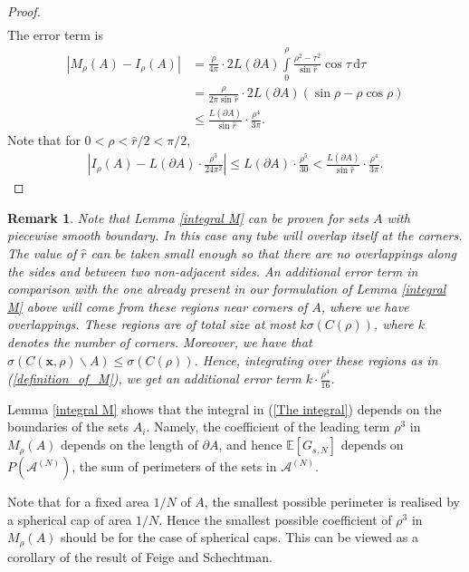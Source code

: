 \documentclass[a4paper,11pt]{amsart}
\newtheorem{remark}{Remark}
\begin{document}
\begin{proof}
\begin{align*}
\end{align*}
The error term is 
\begin{align*}
   \left|M_\rho(A)-I_\rho(A)\right|&=\frac{\rho}{4\pi}\cdot 2L(\partial A)\int\limits_{0}^\rho \frac{\rho^2-\tau^2}{\sin\hat r}\cos \tau\,\mathrm{d}\tau \\&
    =\frac{\rho}{2\pi\sin\hat r}\cdot 2L(\partial A)(\sin\rho -\rho \cos \rho)
    \\
    &\leq\frac{L(\partial A)}{\ \sin \hat r}\cdot \frac{\rho^4}{3\pi}.
\end{align*}
Note that for $0<\rho<\hat{r}/2<\pi/2$,
\begin{align*}
    \left| I_\rho(A)-L(\partial A)\cdot\frac{\rho^3}{24\pi^2} \right|\leq L(\partial A)\cdot \frac{\rho^5}{30} <\frac{L(\partial A)}{\ \sin \hat r}\cdot\frac{\rho^4}{3\pi}.
\end{align*}
\end{proof}

\begin{remark}\label{remark piecewise smooth}
    Note that Lemma \ref{integral M} can be proven for sets $A$ with piecewise smooth boundary. In this case any tube will overlap itself at the corners. The value of $\hat{r}$ can be taken small enough so that there are no overlappings along the sides and between two non-adjacent sides. An additional error term in comparison with the one already present in our formulation of Lemma \ref{integral M} above will come from these regions near corners of $A$, where we have overlappings. These regions are of total size at most $k\sigma\left(C(\rho)\right)$, where $k$ denotes the number of corners. Moreover, we have that $\sigma\left( C\left(\mathbf{x},\rho\right)\backslash A \right)\leq \sigma\left(C(\rho)\right)$. Hence, integrating over these regions as in (\ref{definition_of_M}), we get an additional error term $k\cdot\frac{\rho^4}{16}$.
\end{remark}
Lemma \ref{integral M} shows that the integral in (\ref{The integral}) depends on the boundaries of the sets $A_i$. Namely, the coefficient of the leading term $\rho^3$ in $M_\rho(A)$ depends on the length of $\partial A$, and hence $\mathbb{E}[G_{s,N}]$ depends on $P(\mathcal{A}^{(N)})$, the sum of perimeters of the sets in $\mathcal{A}^{(N)}$.

    Note that for a fixed area $1/N$ of $A$, the smallest possible perimeter is realised by a spherical cap of area $1/N$. Hence the smallest possible coefficient of $\rho^3$ in $M_\rho(A)$ should be for the case of spherical caps. This can be viewed as a corollary of the result of  Feige and Schechtman.
\end{document}
